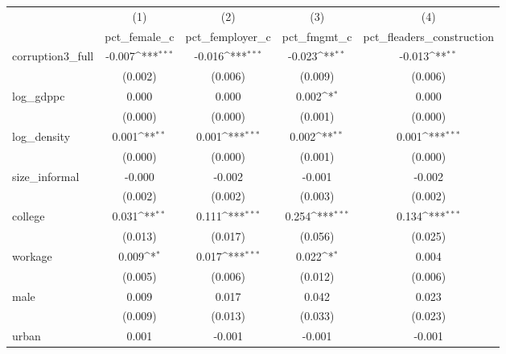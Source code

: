 {
\def\sym#1{\ifmmode^{#1}\else\(^{#1}\)\fi}
\begin{tabular}{l*{4}{c}}
\hline\hline
            &\multicolumn{1}{c}{(1)}&\multicolumn{1}{c}{(2)}&\multicolumn{1}{c}{(3)}&\multicolumn{1}{c}{(4)}\\
            &\multicolumn{1}{c}{pct\_female\_c}&\multicolumn{1}{c}{pct\_femployer\_c}&\multicolumn{1}{c}{pct\_fmgmt\_c}&\multicolumn{1}{c}{pct\_fleaders\_construction}\\
\hline
corruption3\_full&      -0.007\sym{***}&      -0.016\sym{***}&      -0.023\sym{**} &      -0.013\sym{**} \\
            &     (0.002)         &     (0.006)         &     (0.009)         &     (0.006)         \\
[1em]
log\_gdppc   &       0.000         &       0.000         &       0.002\sym{*}  &       0.000         \\
            &     (0.000)         &     (0.000)         &     (0.001)         &     (0.000)         \\
[1em]
log\_density &       0.001\sym{**} &       0.001\sym{***}&       0.002\sym{**} &       0.001\sym{***}\\
            &     (0.000)         &     (0.000)         &     (0.001)         &     (0.000)         \\
[1em]
size\_informal&      -0.000         &      -0.002         &      -0.001         &      -0.002         \\
            &     (0.002)         &     (0.002)         &     (0.003)         &     (0.002)         \\
[1em]
college     &       0.031\sym{**} &       0.111\sym{***}&       0.254\sym{***}&       0.134\sym{***}\\
            &     (0.013)         &     (0.017)         &     (0.056)         &     (0.025)         \\
[1em]
workage     &       0.009\sym{*}  &       0.017\sym{***}&       0.022\sym{*}  &       0.004         \\
            &     (0.005)         &     (0.006)         &     (0.012)         &     (0.006)         \\
[1em]
male        &       0.009         &       0.017         &       0.042         &       0.023         \\
            &     (0.009)         &     (0.013)         &     (0.033)         &     (0.023)         \\
[1em]
urban       &       0.001         &      -0.001         &      -0.001         &      -0.001         \\

\end{tabular}}
